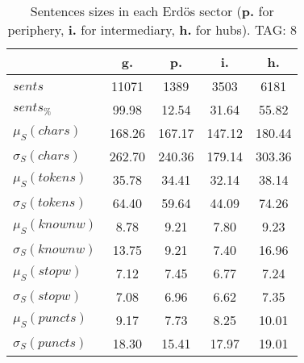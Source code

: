 \begin{table}[h!]
\begin{center}
\begin{tabular}{| l || c | c | c | c |}\hline
 & {\bf g.} & {\bf p.} & {\bf i.} & {\bf h.} \\\hline\hline
$sents$ & 11071  & 1389  & 3503  & 6181 \\
$sents_{\%}$ & 99.98  & 12.54  & 31.64  & 55.82 \\\hline
$\mu_S(chars)$ & 168.26  & 167.17  & 147.12  & 180.44 \\
$\sigma_S(chars)$ & 262.70  & 240.36  & 179.14  & 303.36 \\\hline
$\mu_S(tokens)$ & 35.78  & 34.41  & 32.14  & 38.14 \\
$\sigma_S(tokens)$ & 64.40  & 59.64  & 44.09  & 74.26 \\\hline
$\mu_S(knownw)$ & 8.78  & 9.21  & 7.80  & 9.23 \\
$\sigma_S(knownw)$ & 13.75  & 9.21  & 7.40  & 16.96 \\\hline
$\mu_S(stopw)$ & 7.12  & 7.45  & 6.77  & 7.24 \\
$\sigma_S(stopw)$ & 7.08  & 6.96  & 6.62  & 7.35 \\\hline
$\mu_S(puncts)$ & 9.17  & 7.73  & 8.25  & 10.01 \\
$\sigma_S(puncts)$ & 18.30  & 15.41  & 17.97  & 19.01 \\\hline
\end{tabular}
\caption{Sentences sizes in each Erd\"os sector ({{\bf p.}} for periphery, {{\bf i.}} for intermediary, {{\bf h.}} for hubs). TAG: 8}
\end{center}
\end{table}